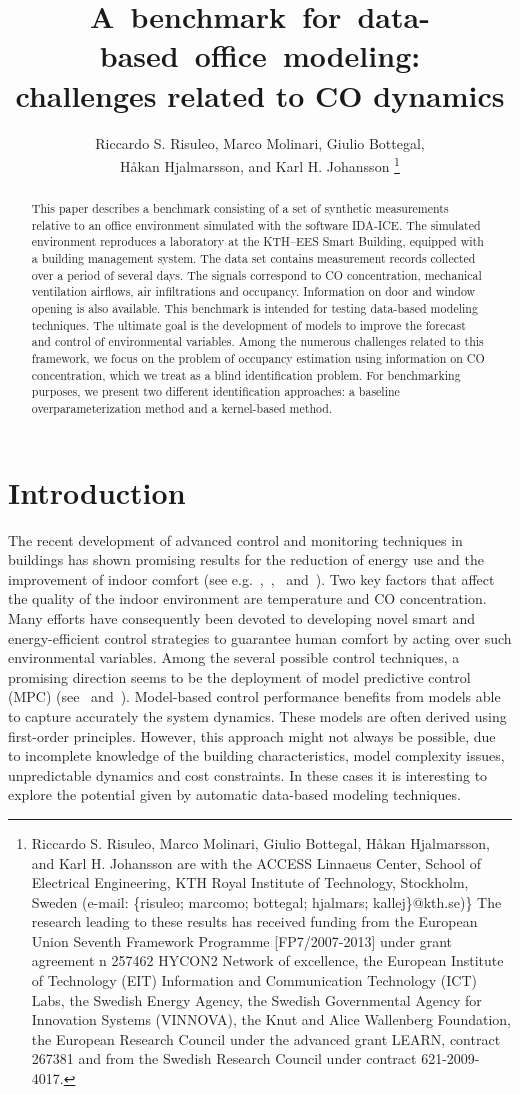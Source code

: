 \documentclass{article}
\title{A~benchmark~for~data-based~office~modeling:\\ challenges related to CO dynamics}
\author{Riccardo S. Risuleo, Marco Molinari, Giulio Bottegal,\\ H\r{a}kan
 Hjalmarsson, and Karl H. Johansson
\thanks{Riccardo S. Risuleo, Marco Molinari, Giulio Bottegal, H\r{a}kan
  Hjalmarsson, and Karl H. Johansson are with the ACCESS Linnaeus Center, School
  of Electrical Engineering, KTH Royal Institute of Technology, Stockholm,
Sweden (e-mail: \{risuleo; marcomo; bottegal; hjalmars; kallej\}@kth.se)\}
  The research leading to these results has received funding from the European
  Union Seventh Framework Programme [FP7/2007-2013] under grant agreement n\textdegree{} 257462 HYCON2 Network of excellence, the
  European Institute of Technology (EIT) Information and Communication
  Technology (ICT) Labs, the Swedish Energy Agency, the Swedish Governmental
  Agency for Innovation Systems (VINNOVA), the Knut and Alice Wallenberg
  Foundation, the European Research Council under the advanced grant LEARN,
  contract 267381 and from the Swedish Research Council under contract
  621-2009-4017.}}
\begin{document}
\maketitle

\begin{abstract}
This paper describes a benchmark consisting of a set of synthetic measurements
relative to an office environment simulated with the software \textsc{IDA-ICE}.
The simulated environment reproduces a laboratory at the KTH--EES Smart Building, equipped with a building management system.  The data set contains
measurement records collected over a period of several days. The signals
correspond to CO concentration, mechanical ventilation
airflows, air infiltrations and occupancy. Information on door and window opening
is also available.  This benchmark is intended for testing data-based modeling
techniques. The ultimate goal is the development of models to improve the forecast
and control of environmental variables.  Among the numerous challenges related
to this framework, we focus on the problem of occupancy estimation using
information on CO concentration, which we treat as a blind identification
problem. For benchmarking purposes, we present two different identification
approaches: a baseline overparameterization method and a kernel-based method.
\end{abstract}



\section{Introduction}
The recent development of advanced control and monitoring techniques in
buildings has shown promising results for the reduction of energy use and the
improvement of indoor comfort (see
e.g.~\cite{vana2014model},~\cite{siroky2011experimental},~\cite{ferreira2012neural}
and~\cite{costa2013building}). Two key factors that
affect the quality of the indoor environment are temperature and CO
concentration. Many efforts have consequently been devoted to developing novel smart
and energy-efficient control strategies to guarantee human comfort by acting
over such environmental variables. Among the several possible control
techniques, a promising direction seems to be the deployment of model predictive
control (MPC) (see~\cite{oldewurtel2012use} and~\cite{parisio2014implementation}).
Model-based control performance benefits from models able to capture
accurately the system dynamics. These models are often derived using first-order
principles. However, this approach might not always be possible, due
to incomplete knowledge of the building characteristics, model complexity
issues, unpredictable dynamics and cost constraints. In these cases it
is interesting to explore the potential given by automatic data-based
modeling techniques.
\end{document}
